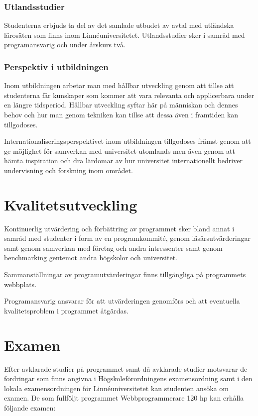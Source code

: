 \documentclass[swedish]{LnuCmThesis}
\begin{document}
\subsubsection*{Utlandsstudier}

Studenterna erbjuds ta del av det samlade utbudet av avtal med utländska lärosäten som
finns inom Linnéuniversitetet. Utlandsstudier sker i samråd med programansvarig och
under årskurs två.

\subsubsection*{Perspektiv i utbildningen}

Inom utbildningen arbetar man med hållbar utveckling genom att tillse att studenterna får
kunskaper som kommer att vara relevanta och applicerbara under en längre tidsperiod.
Hållbar utveckling syftar här på människan och dennes behov och hur man genom
tekniken kan tillse att dessa även i framtiden kan tillgodoses.

Internationaliseringsperspektivet inom utbildningen tillgodoses främst genom att ge
möjlighet för samverkan med universitet utomlands men även genom att hämta
inspiration och dra lärdomar av hur universitet internationellt bedriver undervisning och
forskning inom området.

\section*{Kvalitetsutveckling}

Kontinuerlig utvärdering och förbättring av programmet sker bland annat i samråd med
studenter i form av en programkommité, genom läsårsutvärderingar samt genom
samverkan med företag och andra intressenter samt genom benchmarking gentemot
andra högskolor och universitet.

Sammanställningar av programutvärderingar finns tillgängliga på programmets
webbplats.

Programansvarig ansvarar för att utvärderingen genomförs och att eventuella
kvalitetsproblem i programmet åtgärdas.

\section*{Examen}

Efter avklarade studier på programmet samt då avklarade studier motsvarar de
fordringar som finns angivna i Högskoleförordningens examensordning samt i den lokala
examensordningen för Linnéuniversitetet kan studenten ansöka om examen. De som
fullföljt programmet Webbprogrammerare 120 hp kan erhålla följande examen:
\end{document}
